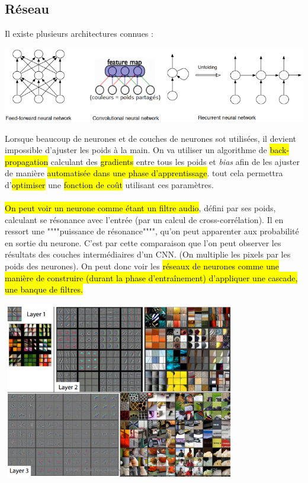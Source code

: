 \documentclass[letterpaper, 12pt]{article}
\newcommand{\alinea}{
\hspace*{0.5cm}}
\begin{document}
		\subsection{Réseau}
			\alinea Il existe plusieurs architectures connues : 
			\begin{center}
				\includegraphics[width=\textwidth]{Images/networks}
			\end{center}
			\alinea Lorsque beaucoup de neurones et de couches de neurones sot utilisées, il devient impossible d'ajuster les poids
				à la main. On va utiliser un algorithme de \hl{back-propagation} calculant des \hl{gradients} entre tous les poids
				et \textit{bias} afin de les ajuster de manière \hl{automatisée dans une phase d'apprentissage}. tout cela permettra
				 d'\hl{optimiser} une \hl{fonction de coût} utilisant ces paramètres.\\
			~\\
			\alinea \hl{On peut voir un neurone comme étant un filtre audio}, défini par ses poids, calculant se résonance avec  
				l'entrée (par un calcul de cross-corrélation). 
				Il en ressort une """"puissance de résonance"""", qu'on peut apparenter aux probabilité en sortie du neurone. 
				C'est par cette comparaison que l'on peut observer les résultats des couches intermédiaires d'un CNN.
				(On multiplie les pixels par les poids des neurones). On peut donc voir les \hl{réseaux de neurones comme une 
				manière de construire (durant la phase d'entraînement) d'appliquer une cascade, une banque de filtres.} 
			\begin{center}
				\includegraphics[width=4in]{Images/cnn}
			\end{center}
\end{document}
